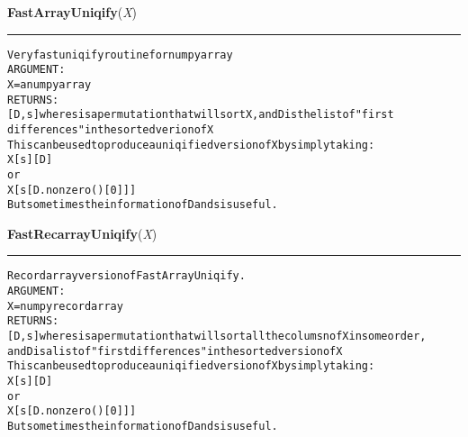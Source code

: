     \vspace{0.5ex}

\hspace{.8\funcindent}\begin{boxedminipage}{\funcwidth}

    \raggedright \textbf{FastArrayUniqify}(\textit{X})

    \vspace{-1.5ex}

    \rule{\textwidth}{0.5\fboxrule}
\setlength{\parskip}{2ex}
\begin{alltt}

Very fast uniqify routine for numpy array 
ARGUMENT:
        X = a numpy array
RETURNS:
        [D,s] where s is a permutation that will sort X, and D is the list of "first 
        differences" in the sorted verion of X
        This can be used to produce a uniqified version of X by simply taking:
                X[s][D]
        or
                X[s[D.nonzero()[0]]]
        But sometimes the information of D and s is useful. 
                
\end{alltt}

\setlength{\parskip}{1ex}
    \end{boxedminipage}

    \label{System:Utils:FastRecarrayUniqify}

    \vspace{0.5ex}

\hspace{.8\funcindent}\begin{boxedminipage}{\funcwidth}

    \raggedright \textbf{FastRecarrayUniqify}(\textit{X})

    \vspace{-1.5ex}

    \rule{\textwidth}{0.5\fboxrule}
\setlength{\parskip}{2ex}
\begin{alltt}

Record array version of FastArrayUniqify.
ARGUMENT:
        X = numpy record array
RETURNS:
        [D,s] where s is a permutation that will sort all the columsn of X in some order,
        and D is a list of "first differences" in the sorted version of X
        This can be used to produce a uniqified version of X by simply taking:
                X[s][D]
        or
                X[s[D.nonzero()[0]]]
        But sometimes the information of D and s is useful.                     
\end{alltt}

\setlength{\parskip}{1ex}
    \end{boxedminipage}


